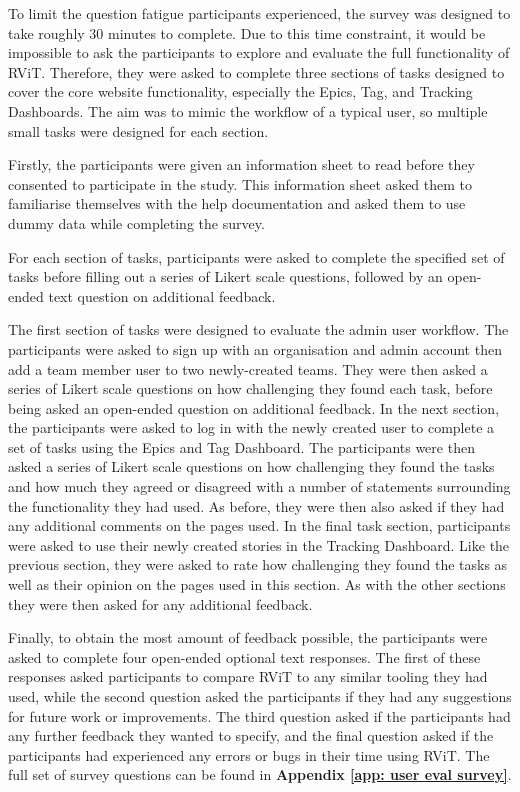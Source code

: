 \documentclass[l4proj.tex]{subfiles}
\begin{document}
To limit the question fatigue participants experienced, the survey was designed to take roughly 30 minutes to complete. Due to this time constraint, it would be impossible to ask the participants to explore and evaluate the full functionality of RViT. Therefore, they were asked to complete three sections of tasks designed to cover the core website functionality, especially the Epics, Tag, and Tracking Dashboards. The aim was to mimic the workflow of a typical user, so multiple small tasks were designed for each section.

Firstly, the participants were given an information sheet to read before they consented to participate in the study. This information sheet asked them to familiarise themselves with the help documentation and asked them to use dummy data while completing the survey.

For each section of tasks, participants were asked to complete the specified set of tasks before filling out a series of Likert scale questions, followed by an open-ended text question on additional feedback.

The first section of tasks were designed to evaluate the admin user workflow. The participants were asked to sign up with an organisation and admin account then add a team member user to two newly-created teams. They were then asked a series of Likert scale questions on how challenging they found each task, before being asked an open-ended question on additional feedback. In the next section, the participants were asked to log in with the newly created user to complete a set of tasks using the Epics and Tag Dashboard. The participants were then asked a series of Likert scale questions on how challenging they found the tasks and how much they agreed or disagreed with a number of statements surrounding the functionality they had used. As before, they were then also asked if they had any additional comments on the pages used. In the final task section, participants were asked to use their newly created stories in the Tracking Dashboard. Like the previous section, they were asked to rate how challenging they found the tasks as well as their opinion on the pages used in this section. As with the other sections they were then asked for any additional feedback.

Finally, to obtain the most amount of feedback possible, the participants were asked to complete four open-ended optional text responses. The first of these responses asked participants to compare RViT to any similar tooling they had used, while the second question asked the participants if they had any suggestions for future work or improvements. The third question asked if the participants had any further feedback they wanted to specify, and the final question asked if the participants had experienced any errors or bugs in their time using RViT. The full set of survey questions can be found in \textbf{Appendix \ref{app: user eval survey}}.
\end{document}
